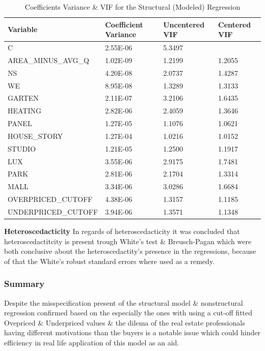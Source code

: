 \documentclass[]{article}
\begin{document}
\begin{table}[H]
	\centering
	\caption{Coefficients Variance \& VIF for the Structural (Modeled) Regression}
	\label{tab:coef_vif_2}
	\begin{tabular}{@{}llll@{}}
		\hline
		\textbf{Variable}            & \textbf{Coefficient Variance} & \textbf{Uncentered VIF} & \textbf{Centered VIF} \\ \hline
		C                   & 2.55E-06    & 5.3497     &          \\
		AREA\_MINUS\_AVG\_Q & 1.02E-09    & 1.2199     & 1.2055   \\
		NS                  & 4.20E-08    & 2.0737     & 1.4287   \\
		WE                  & 8.95E-08    & 1.3289     & 1.3133   \\
		GARTEN              & 2.11E-07    & 3.2106     & 1.6435   \\
		HEATING             & 2.82E-06    & 2.4059     & 1.3646   \\
		PANEL               & 1.27E-05    & 1.1076     & 1.0621   \\
		HOUSE\_STORY        & 1.27E-04    & 1.0216     & 1.0152   \\
		STUDIO              & 1.21E-05    & 1.2500     & 1.1917   \\
		LUX                 & 3.55E-06    & 2.9175     & 1.7481   \\
		PARK                & 2.81E-06    & 2.1704     & 1.3314   \\
		MALL                & 3.34E-06    & 3.0286     & 1.6684   \\
		OVERPRICED\_CUTOFF  & 4.38E-06    & 1.3157     & 1.1185   \\
		UNDERPRICED\_CUTOFF & 3.94E-06    & 1.3571     & 1.1348   \\ \hline
	\end{tabular}
	
\end{table}


\textbf{Heteroscedacticity} 
In regards of heteroscedacticity it was concluded that heteroscedactitcity is present trough White's test \& Breusch-Pagan which were both conclusive about the heteroscedactity's presence in the regressions, because of that the White's robust standard errors where used as a remedy.


\subsubsection{Summary}
Despite the misspecification present of the structural model \& nonstructural regression confirmed  based on the especially the ones with using a cut-off fitted Ovepriced \& Underpriced values \& the dilema of the real estate professionals having different motivations than the buyers is a notable issue which could hinder efficiency in real life application of this model as an aid.\\
\end{document}
